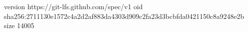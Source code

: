 version https://git-lfs.github.com/spec/v1
oid sha256:2711130e1572c4a2d2af883da4303d909c2fa23d3bcbfda0421150c8a9248e2b
size 14005
